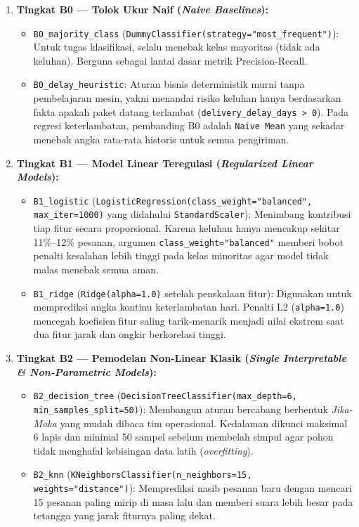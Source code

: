 \documentclass[11pt,a4paper,oneside]{book}
\newcommand{\code}[1]{{\small\nolinkurl{#1}}}
\begin{document}
\begin{enumerate}
  \item \textbf{Tingkat B0 --- Tolok Ukur Naif (\emph{Naive Baselines}):}
    \begin{itemize}
      \item \code{B0_majority_class} (\code{DummyClassifier(strategy="most_frequent")}): Untuk tugas klasifikasi, selalu menebak kelas mayoritas (tidak ada keluhan). Berguna sebagai lantai dasar metrik Precision-Recall.
      \item \code{B0_delay_heuristic}: Aturan bisnis deterministik murni tanpa pembelajaran mesin, yakni menandai risiko keluhan hanya berdasarkan fakta apakah paket datang terlambat (\code{delivery_delay_days > 0}). Pada regresi keterlambatan, pembanding B0 adalah \code{Naive Mean} yang sekadar menebak angka rata-rata historis untuk semua pengiriman.
    \end{itemize}
  \item \textbf{Tingkat B1 --- Model Linear Teregulasi (\emph{Regularized Linear Models}):}
    \begin{itemize}
      \item \code{B1_logistic} (\code{LogisticRegression(class_weight="balanced", max_iter=1000)} yang didahului \code{StandardScaler}): Menimbang kontribusi tiap fitur secara proporsional. Karena keluhan hanya mencakup sekitar 11\%--12\% pesanan, argumen \code{class_weight="balanced"} memberi bobot penalti kesalahan lebih tinggi pada kelas minoritas agar model tidak malas menebak semua aman.
      \item \code{B1_ridge} (\code{Ridge(alpha=1.0)} setelah penskalaan fitur): Digunakan untuk memprediksi angka kontinu keterlambatan hari. Penalti L2 (\code{alpha=1.0}) mencegah koefisien fitur saling tarik-menarik menjadi nilai ekstrem saat dua fitur jarak dan ongkir berkorelasi tinggi.
    \end{itemize}
  \item \textbf{Tingkat B2 --- Pemodelan Non-Linear Klasik (\emph{Single Interpretable \& Non-Parametric Models}):}
    \begin{itemize}
      \item \code{B2_decision_tree} (\code{DecisionTreeClassifier(max_depth=6, min_samples_split=50)}): Membangun aturan bercabang berbentuk \emph{Jika-Maka} yang mudah dibaca tim operasional. Kedalaman dikunci maksimal 6 lapis dan minimal 50 sampel sebelum membelah simpul agar pohon tidak menghafal kebisingan data latih (\emph{overfitting}).
      \item \code{B2_knn} (\code{KNeighborsClassifier(n_neighbors=15, weights="distance")}): Memprediksi nasib pesanan baru dengan mencari 15 pesanan paling mirip di masa lalu dan memberi suara lebih besar pada tetangga yang jarak fiturnya paling dekat.

\end{itemize}
\end{enumerate}
\end{document}
